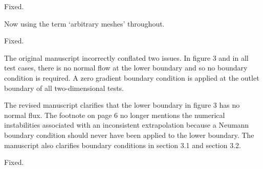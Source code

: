 \documentclass[times]{elsarticle}
\begin{document}
\begin{quotation}
\begin{comment}
\item  p.4, last paragraph in Section 2.0: "methods are described next"
    instead of "methods described next".
\end{comment}
\end{quotation}
Fixed.

\begin{quotation}
\begin{comment}
\item  p.5, first paragraph: Is it "arbitrary meshes" or "arbitrary
    structured meshes"?
\end{comment}
\end{quotation}
Now using the term `arbitrary meshes' throughout.

\begin{quotation}
\begin{comment}
\item  p.5, last paragraph of Section 2.1.1.: "dirichlet" should be
    upper case "Dirichlet".
\end{comment}
\end{quotation}
Fixed.

\begin{quotation}
\begin{comment}
\item p.7, caption of Fig. 3, last sentence: It is stated that a
    von Neumann boundary condition is assumed. However, the
    footnote on p.5 says that Neumann BCs are excluded from the
    set of stencil boundary faces?
\end{comment}
\end{quotation}
The original manuscript incorrectly conflated two issues.  In figure 3 and in all test cases, there is no normal flow at the lower boundary and so no boundary condition is required.  A zero gradient boundary condition is applied at the outlet boundary of all two-dimensional tests.

The revised manuscript clarifies that the lower boundary in figure 3 has no normal flux.  The footnote on page 6 no longer mentions the numerical instabilities associated with an inconsistent extrapolation because a Neumann boundary condition should never have been applied to the lower boundary.  The manuscript also clarifies boundary conditions in section 3.1 and section 3.2.

\begin{quotation}
\begin{comment}
\item p.9, caption of Fig. 4, first sentence: "A one-dimensional
    least squares fits" should probably read "One-dimensional
    least squares fits".
\end{comment}
\end{quotation}
Fixed.
\end{document}
